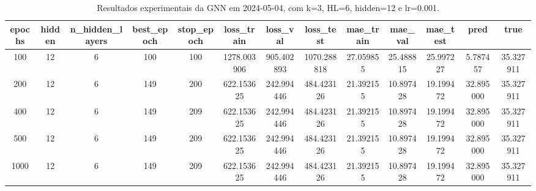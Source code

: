 \begin{table}[h]
\centering
\caption{Resultados experimentais da GNN em 2024-05-04, com k=3, HL=6, hidden=12 e lr=0.001.}
\label{tab:gnn_results_k3_hl6_h12_d20240504}
\begin{tabular}{ccccccccccccc}
\toprule
epochs & hidden & n\_hidden\_layers & best\_epoch & stop\_epoch & loss\_train & loss\_val & loss\_test & mae\_train & mae\_val & mae\_test & pred & true \\
\midrule
100 & 12 & 6 & 100 & 100 & 1278.003906 & 905.402893 & 1070.288818 & 27.059855 & 25.488815 & 25.997227 & 5.787457 & 35.327911 \\
200 & 12 & 6 & 149 & 200 & 622.153625 & 242.994446 & 484.423126 & 21.392155 & 10.897428 & 19.199472 & 32.895000 & 35.327911 \\
400 & 12 & 6 & 149 & 209 & 622.153625 & 242.994446 & 484.423126 & 21.392155 & 10.897428 & 19.199472 & 32.895000 & 35.327911 \\
500 & 12 & 6 & 149 & 209 & 622.153625 & 242.994446 & 484.423126 & 21.392155 & 10.897428 & 19.199472 & 32.895000 & 35.327911 \\
1000 & 12 & 6 & 149 & 209 & 622.153625 & 242.994446 & 484.423126 & 21.392155 & 10.897428 & 19.199472 & 32.895000 & 35.327911 \\
\bottomrule
\end{tabular}
\end{table}
